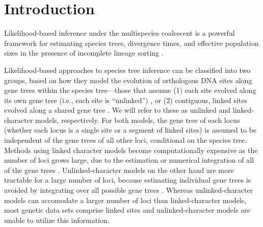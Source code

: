 \section{Introduction}




Likelihood-based inference under the multispecies coalescent is a powerful 
framework for estimating species trees,  divergence times, and  effective 
population sizes in the presence of incomplete lineage sorting 
\citep{xuChallengesSpeciesTree2016}.

Likelihood-based approaches to species 
tree inference can be classified into two groups, based on how they model the 
evolution of orthologous DNA sites along gene trees within the species 
tree---those that assume (1) each site evolved along its own gene tree 
(i.e., each site is ``unlinked'') 
\citep{bryantInferringSpeciesTrees2012, maioPoMoAlleleFrequencyBased2015}, 
or (2) contiguous, linked sites evolved along a shared gene tree 
\citep{liuSpeciesTreesGene2007, ogilvieStarBEAST2BringsFaster2017, 
yangBPPProgramSpecies2015}. We will refer to these as unlinked and 
linked-character models, respectively. For both models, the gene tree of each 
locus (whether each locus is a single site or a segment of linked sites) 
is assumed to be independent of the gene 
trees of all other loci, conditional on the species tree.
Methods using linked character models become computationally expensive as the
number of loci grows large, due to the estimation or numerical integration of
all of the gene trees \citep{bryantInferringSpeciesTrees2012}.
Unlinked-character models on the other 
hand are more tractable for a large number of loci, because  estimating 
individual gene trees is avoided by integrating over all possible gene trees 
\citep{bryantInferringSpeciesTrees2012}.
Whereas unlinked-character models can accomodate a larger number of loci than
linked-character models, most genetic data sets comprise linked sites and
unlinked-character models are unable to utilize this information.

